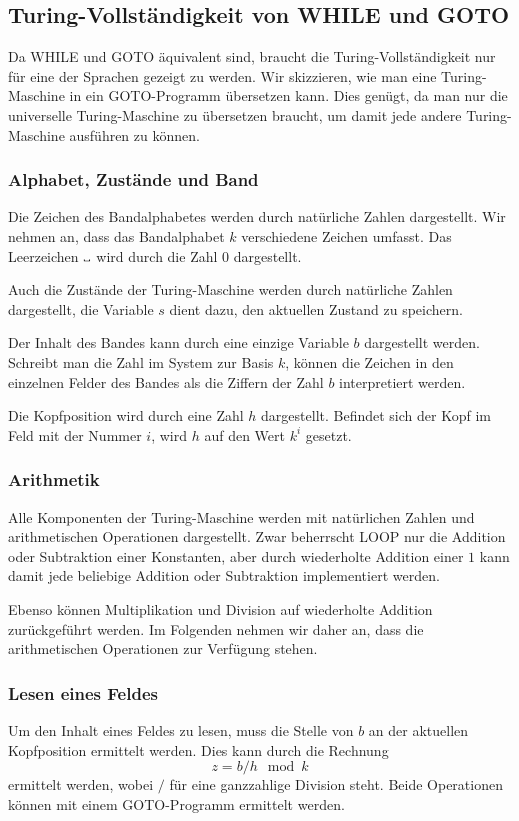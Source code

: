 \subsection{Turing-Vollständigkeit von WHILE und GOTO}
Da WHILE und GOTO äquivalent sind, braucht die Turing-Vollständigkeit
nur für eine der Sprachen gezeigt zu werden.
Wir skizzieren, wie man eine Turing-Maschine in ein GOTO-Programm
übersetzen kann.
Dies genügt, da man nur die universelle
Turing-Maschine zu übersetzen braucht, um damit jede andere
Turing-Maschine ausführen zu können.

\subsubsection{Alphabet, Zustände und Band}
Die Zeichen des Bandalphabetes werden durch natürliche Zahlen
dargestellt.
Wir nehmen an, dass das Bandalphabet $k$ verschiedene Zeichen
umfasst.
Das Leerzeichen $\text{\textvisiblespace}$ wird durch die Zahl $0$
dargestellt.

Auch die Zustände der Turing-Maschine werden durch natürliche Zahlen
dargestellt,
die Variable $s$ dient dazu, den aktuellen Zustand zu
speichern.

Der Inhalt des Bandes kann durch eine einzige Variable $b$ dargestellt
werden.
Schreibt man die Zahl im System zur Basis $k$, können die
Zeichen in den einzelnen Felder des Bandes als die Ziffern
der Zahl $b$ interpretiert werden.

Die Kopfposition wird durch eine Zahl $h$ dargestellt.
Befindet sich
der Kopf im Feld mit der Nummer $i$, wird $h$ auf den Wert $k^i$
gesetzt.

\subsubsection{Arithmetik}
Alle Komponenten der Turing-Maschine werden mit natürlichen Zahlen
und arithmetischen Operationen dargestellt.
Zwar beherrscht LOOP nur die Addition oder Subtraktion einer Konstanten,
aber durch wiederholte Addition einer $1$ kann damit jede beliebige
Addition oder Subtraktion implementiert werden.

Ebenso können Multiplikation und Division auf wiederholte Addition
zurückgeführt werden.
Im Folgenden nehmen wir daher an, dass die arithmetischen Operationen
zur Verfügung stehen.

\subsubsection{Lesen eines Feldes}
Um den Inhalt eines Feldes zu lesen, muss die Stelle von $b$ an der
aktuellen Kopfposition ermittelt werden.
Dies kann durch die Rechnung
\begin{equation}
z=b / h \mod k
\label{getchar}
\end{equation}
ermittelt werden, wobei $/$ für eine ganzzahlige Division steht.
Beide Operationen können mit einem GOTO-Programm ermittelt werden.

